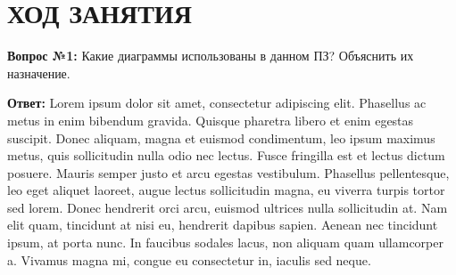 \section*{ХОД ЗАНЯТИЯ}

\textbf{Вопрос №1:}
Какие диаграммы использованы в данном ПЗ? Объяснить их назначение.

\textbf{Ответ:}
Lorem ipsum dolor sit amet, consectetur adipiscing elit.
Phasellus ac metus in enim bibendum gravida.
Quisque pharetra libero et enim egestas suscipit.
Donec aliquam, magna et euismod condimentum, leo ipsum maximus metus,
quis sollicitudin nulla odio nec lectus. Fusce fringilla est et lectus dictum posuere.
 Mauris semper justo et arcu egestas vestibulum. Phasellus pellentesque,
leo eget aliquet laoreet, augue lectus sollicitudin magna,
eu viverra turpis tortor sed lorem.
Donec hendrerit orci arcu, euismod ultrices nulla sollicitudin at.
Nam elit quam, tincidunt at nisi eu, hendrerit dapibus sapien.
Aenean nec tincidunt ipsum, at porta nunc. In faucibus sodales lacus,
non aliquam quam ullamcorper a. Vivamus magna mi,
congue eu consectetur in, iaculis sed neque.~\cite{bloch08}